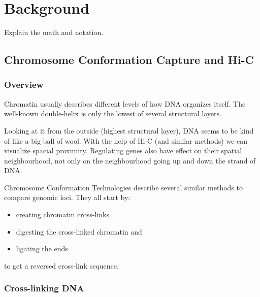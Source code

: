 \chapter{Background}\label{chap:background}
Explain the math and notation.
% 
% 


\section{Chromosome Conformation Capture and Hi-C}\label{sec:c3}\label{sec:hic}



\subsection{Overview}


Chromatin usually describes different levels of how DNA organizes itself. The
well-known double-helix is only the lowest of several structural layers.

Looking at it from the outside (highest structural layer), DNA seems to be kind
of like a big ball of wool. With the help of Hi-C (and similar methods) we can
visualize spacial proximity. Regulating  genes also
have effect on their spatial neighbourhood, not only on the neighbourhood
going up and down the strand of DNA.



Chromosome Conformation Technologies describe several similar methods to
compare genomic loci. They all start by:

\begin{itemize}
    \item creating chromatin cross-links
    \item digesting the cross-linked chromatin and
    \item ligating the ends
\end{itemize}

to get a reversed cross-link sequence.

\subsection{Cross-linking DNA}

